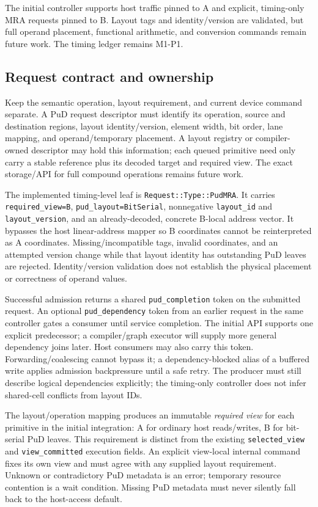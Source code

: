 \documentclass[9pt,twocolumn]{extarticle}
\newcommand{\cmd}[1]{\texttt{#1}}
\newcommand{\timingrevision}{M1-P1}
\begin{document}
The initial controller supports host traffic pinned to A and explicit,
timing-only MRA requests pinned to B. Layout tags and identity/version are
validated, but full operand placement, functional arithmetic, and conversion
commands remain future work. The timing ledger remains \timingrevision{}.

\subsection{Request contract and ownership}

Keep the semantic operation, layout requirement, and current device command
separate. A PuD request descriptor must identify its operation, source and
destination regions, layout identity/version, element width, bit order, lane
mapping, and operand/temporary placement. A layout registry or compiler-owned
descriptor may hold this information; each queued primitive need only carry
a stable reference plus its decoded target and required view. The exact
storage/API for full compound operations remains future work.

The implemented timing-level leaf is \cmd{Request::Type::PudMRA}. It carries
\cmd{required\_view=B}, \cmd{pud\_layout=BitSerial}, nonnegative
\cmd{layout\_id} and \cmd{layout\_version}, and an already-decoded, concrete
B-local address vector. It bypasses the host linear-address mapper so B
coordinates cannot be reinterpreted as A coordinates. Missing/incompatible
tags, invalid coordinates, and an attempted version change while that layout
identity has outstanding PuD leaves are rejected. Identity/version validation
does not establish the physical placement or correctness of operand values.

Successful admission returns a shared \cmd{pud\_completion} token on the
submitted request. An optional \cmd{pud\_dependency} token from an earlier
request in the same controller gates a consumer until service completion.
The initial API supports one explicit predecessor; a compiler/graph executor
will supply more general dependency joins later. Host consumers may also
carry this token. Forwarding/coalescing cannot bypass it; a dependency-blocked
alias of a buffered write applies admission backpressure until a safe retry.
The producer must still describe logical dependencies explicitly; the
timing-only controller does not infer shared-cell conflicts from layout IDs.

The layout/operation mapping produces an immutable \emph{required view} for
each primitive in the initial integration: A for ordinary host reads/writes,
B for bit-serial PuD leaves. This requirement is distinct from the existing
\cmd{selected\_view} and \cmd{view\_committed} execution fields. An explicit
view-local internal command fixes its own view and must agree with any supplied
layout requirement. Unknown or contradictory PuD metadata is an error;
temporary resource contention is a wait condition. Missing PuD metadata must
never silently fall back to the host-access default.
\end{document}
